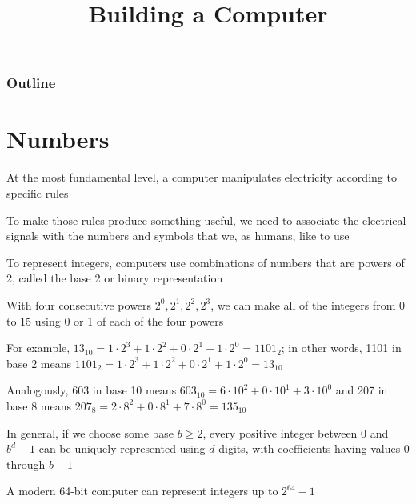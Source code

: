 \documentclass[8pt,a4paper,compress]{beamer}
\title{Building a Computer}
\date{}
\begin{document}
\begin{frame}
\vfill
\titlepage
\end{frame}

\begin{frame}
\frametitle{Outline}
\tableofcontents
\end{frame}

\section{Numbers}
\begin{frame}[fragile]
\pause

At the most fundamental level, a computer manipulates electricity according to specific rules

\pause
\bigskip

To make those rules produce something useful, we need to associate the electrical signals with the numbers and symbols that we, as humans, like to use

\pause
\bigskip

To represent integers, computers use combinations of numbers that are powers of 2, called the base 2 or binary representation

\pause
\bigskip

With four consecutive powers $2^0, 2^1, 2^2, 2^3$, we can make all of the integers from 0 to 15 using 0 or 1 of each of the four powers

\pause
\bigskip

For example, $13_{10} = 1 \cdot 2^3 + 1 \cdot 2^2 + 0 \cdot 2^1 + 1 \cdot 2^0 = 1101_{2}$; in other words, 1101 in base 2 means $1101_{2} = 1 \cdot 2^3 + 1 \cdot 2^2 + 0 \cdot 2^1 + 1 \cdot 2^0 = 13_{10}$

\pause
\bigskip

Analogously, 603 in base 10 means $603_{10} = 6 \cdot 10^2 + 0 \cdot 10^1 + 3 \cdot 10^0$ and 207 in base 8 means $207_{8} = 2 \cdot 8^2 + 0 \cdot 8^1 + 7 \cdot 8^0 = 135_{10}$

\pause
\bigskip

In general, if we choose some base $b \geq 2$, every positive integer between 0 and $b^d-1$ can be uniquely represented using $d$ digits, with coefficients having values 0 through $b-1$

\pause
\bigskip

A modern 64-bit computer can represent integers up to $2^{64} - 1$
\end{frame}
\end{document}
